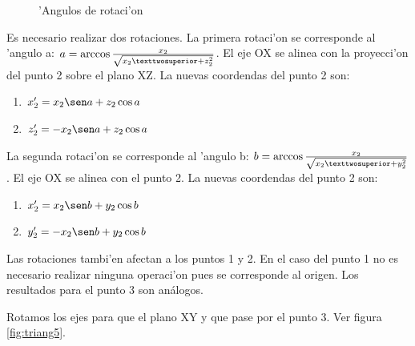 \begin{figure}[h!]
	\begin{center}
     	\end{center}
    	\caption{'Angulos de rotaci'on}\label{fig:triang3}
\end{figure}

Es necesario realizar dos rotaciones. La primera rotaci'on se corresponde al 'angulo a: $a = \arccos {x_2 \over {\sqrt{x_2²+z_2^2}}}$. El eje OX se alinea con la proyecci'on del punto 2 sobre el plano XZ. La nuevas coordendas del punto 2 son:

\begin{enumerate}
\item $x_2' = x_2 \sen a + z_2 \cos a$
\item $z_2' = - x_2 \sen a + z_2 \cos a$
\end{enumerate}

La segunda rotaci'on se corresponde al 'angulo b: $b = \arccos {x_2 \over {\sqrt{x_2²+y_2^2}}}$. El eje OX se alinea con el punto 2. La nuevas coordendas del punto 2 son:

\begin{enumerate}
\item $x_2' = x_2 \sen b + y_2 \cos b$
\item $y_2' = - x_2 \sen b + y_2 \cos b$
\end{enumerate}

Las rotaciones tambi'en afectan a los puntos 1 y 2. En el caso del punto 1 no es necesario realizar ninguna operaci'on pues se corresponde al origen. Los resultados para el punto 3 son análogos. \bigskip\newline

Rotamos los ejes para que el plano XY y que pase por el punto 3.
Ver figura \ref{fig:triang5}.


